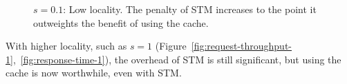 \documentclass[preprint,11pt]{sigplanconf}
\begin{document}
\begin{figure}
 \centering
 \hfill
 \caption{$s = 0.1$: Low locality. The penalty of STM increases to the point it
    outweights the benefit of using the cache.}
\end{figure}

With higher locality, such as $s=1$
(Figure~\ref{fig:request-throughput-1},~\ref{fig:response-time-1}), the overhead
of STM is still significant, but using the cache is now worthwhile, even with
STM. 
\end{document}
